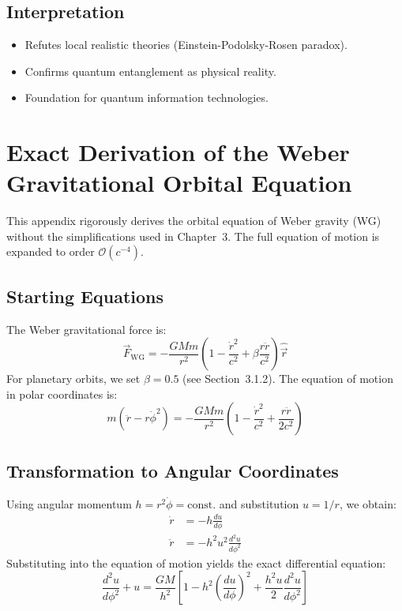 \subsection{Interpretation}
\begin{itemize}
\item Refutes local realistic theories (Einstein-Podolsky-Rosen paradox).
\item Confirms quantum entanglement as physical reality.
\item Foundation for quantum information technologies.
\end{itemize}

\newpage
\section{Exact Derivation of the Weber Gravitational Orbital Equation}
\label{sec:exact_derivation}

This appendix rigorously derives the orbital equation of Weber gravity (WG) without the simplifications used in Chapter~3. The full equation of motion is expanded to order $\mathcal{O}(c^{-4})$.

\subsection{Starting Equations}
The Weber gravitational force is:
\begin{equation}
\vec{F}_{\text{WG}} = -\frac{GMm}{r^2} \left(1 - \frac{\dot{r}^2}{c^2} + \beta \frac{r\ddot{r}}{c^2}\right)\hat{\vec{r}}
\end{equation}
For planetary orbits, we set $\beta = 0.5$ (see Section~3.1.2). The equation of motion in polar coordinates is:
\begin{equation}
m\left(\ddot{r} - r\dot{\phi}^2\right) = -\frac{GMm}{r^2}\left(1 - \frac{\dot{r}^2}{c^2} + \frac{r\ddot{r}}{2c^2}\right)
\end{equation}

\subsection{Transformation to Angular Coordinates}
Using angular momentum $h = r^2\dot{\phi} = \text{const.}$ and substitution $u = 1/r$, we obtain:
\begin{align}
\dot{r} &= -h\frac{du}{d\phi} \\
\ddot{r} &= -h^2u^2\frac{d^2u}{d\phi^2}
\end{align}
Substituting into the equation of motion yields the exact differential equation:
\begin{equation}
\frac{d^2u}{d\phi^2} + u = \frac{GM}{h^2}\left[1 - h^2\left(\frac{du}{d\phi}\right)^2 + \frac{h^2u}{2}\frac{d^2u}{d\phi^2}\right]
\end{equation}

